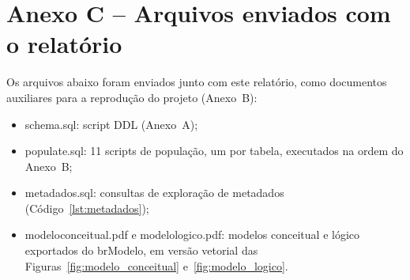 \documentclass[12pt,a4paper]{article}
\newcommand{\tbus}{\textunderscore\allowbreak}
\newcommand{\tb}[1]{{\ttfamily\let\_\tbus #1}}
\begin{document}


\section*{Anexo C -- Arquivos enviados com o relatório}
Os arquivos abaixo foram enviados junto com este relatório, como documentos auxiliares
para a reprodução do projeto (Anexo~B):
\begin{itemize}
    \item \tb{schema.sql}: script DDL (Anexo~A);
    \item \tb{populate\_*.sql}: 11 scripts de população, um por tabela, executados na
    ordem do Anexo~B;
    \item \tb{metadados.sql}: consultas de exploração de metadados (Código~\ref{lst:metadados});
    \item \tb{modelo\_conceitual.pdf} e \tb{modelo\_logico.pdf}: modelos conceitual e
    lógico exportados do brModelo, em versão vetorial das
    Figuras~\ref{fig:modelo_conceitual} e~\ref{fig:modelo_logico}.
\end{itemize}
\end{document}

